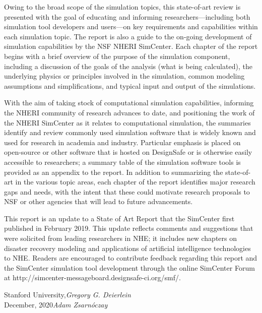 Owing to the broad scope of the simulation topics, this state-of-art review is presented with the goal of educating and informing researchers---including both simulation tool developers and users---on key requirements and capabilities within each simulation topic. The report is also a guide to the on-going development of simulation capabilities by the NSF NHERI SimCenter. Each chapter of the report begins with a brief overview of the purpose of the simulation component, including a discussion of the goals of the analysis (what is being calculated), the underlying physics or principles involved in the simulation, common modeling assumptions and simplifications, and typical input and output of the simulations. 

With the aim of taking stock of computational simulation capabilities, informing the NHERI community of research advances to date, and positioning the work of the NHERI SimCenter as it relates to computational simulation, the summaries identify and review commonly used simulation software that is widely known and used for research in academia and industry. Particular emphasis is placed on open-source or other software that is hosted on DesignSafe or is otherwise easily accessible to researchers; a summary table of the simulation software tools is provided as an appendix to the report. In addition to summarizing the state-of-art in the various topic areas, each chapter of the report identifies major research gaps and needs, with the intent that these could motivate research proposals to NSF or other agencies that will lead to future advancements.

This report is an update to a State of Art Report that the SimCenter first published in February 2019.  This update reflects comments and suggestions that were solicited from leading researchers in NHE; it includes new chapters on disaster recovery modeling and applications of artificial intelligence technologies to NHE.  Readers are encouraged to contribute feedback regarding this report and the SimCenter simulation tool development through the online SimCenter Forum at http://simcenter-messageboard.designsafe-ci.org/smf/.


\vspace{\baselineskip}
\begin{flushright}\noindent
Stanford University,\hfill {\it Gregory G. Deierlein}\\
December, 2020\hfill {\it Adam Zsarnóczay}\\
\end{flushright}


